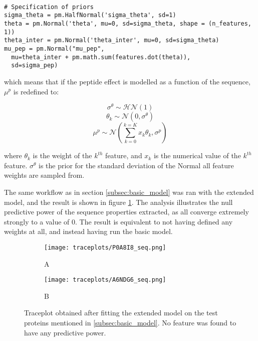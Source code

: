 \begin{verbatim}

# Specification of priors
sigma_theta = pm.HalfNormal('sigma_theta', sd=1)
theta = pm.Normal('theta', mu=0, sd=sigma_theta, shape = (n_features, 1))
theta_inter = pm.Normal('theta_inter', mu=0, sd=sigma_theta)
mu_pep = pm.Normal("mu_pep",
  mu=theta_inter + pm.math.sum(features.dot(theta)),
  sd=sigma_pep)   
\end{verbatim}

which means that if the peptide effect is modelled as a function of the sequence, $\mu^p$ is redefined to:

        
\begin{equation}
\nonumber \sigma^{\theta} \sim \mathcal{HN}(1)
\end{equation}
\begin{equation}
\nonumber \theta_k \sim \mathcal{N}(0, \sigma^{\theta})
\end{equation}
\begin{equation}
\nonumber \mu^p \sim \mathcal{N}(\sum_{k=0}^{k=K}{x_k \theta_k}, \sigma^p)
\end{equation}

where $\theta_k$ is the weight of the $k^{th}$ feature, and $x_k$ is the numerical value of the $k^{th}$ feature. $\sigma^{\theta}$ is the prior for the standard deviation of the Normal all feature weights are sampled from.

The same workflow as in section \ref{subsec:basic_model} was ran with the extended model, and the result is shown in figure \ref{fig:traceplots_seq}. The analysis illustrates the null predictive power of the sequence properties extracted, as all converge extremely strongly to a value of 0. The result is equivalent to not having defined any weights at all, and instead having run the basic model.



\begin{figure}[H]
\begin{subfigure}{\textwidth}
\centering
\caption*{A}
\texttt{[image: traceplots/P0A8I8\_seq.png]}
\end{subfigure}
\bigskip
\begin{subfigure}{\textwidth}
\centering
\caption*{B}
\texttt{[image: traceplots/A6NDG6\_seq.png]}
\end{subfigure}
\caption{Traceplot obtained after fitting the extended model on the test proteins mentioned in \ref{subsec:basic_model}. No feature was found to have any predictive power.}
\label{fig:traceplots_seq}
\end{figure}

